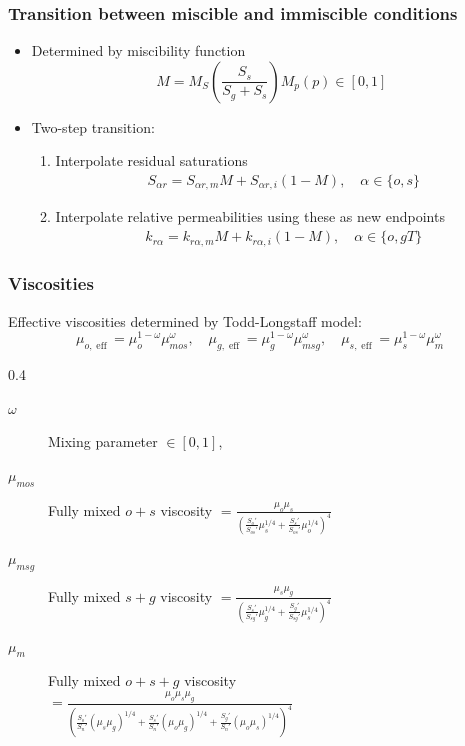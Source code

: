 \documentclass[screen, aspectratio=43]{beamer}
\DeclareMathOperator{\eff}{eff}
\begin{document}
\begin{frame}
  \frametitle{Transition between miscible and immiscible conditions}
  \begin{itemize}
  \item Determined by miscibility function
  \begin{equation*}
      M = M_S\left(\frac{S_s}{S_g + S_s}\right) M_p(p) \in [0,1]
    \end{equation*}
  \item Two-step transition:
    \begin{enumerate}
    \item Interpolate residual saturations
      \begin{align*}
        S_{\alpha r} = S_{\alpha r,m}M + S_{\alpha r,i}(1-M), \quad \alpha \in \{o,s\}
      \end{align*}
    \item Interpolate relative permeabilities using these as new endpoints
      \begin{align*}
        k_{r \alpha} = k_{r\alpha,m}M + k_{r\alpha,i}(1-M), \quad \alpha \in \{o,gT\}
      \end{align*}
    \end{enumerate}
  \end{itemize}
\end{frame}

\begin{frame}
  \frametitle{Viscosities}
  \vspace{0.2cm}
  Effective viscosities determined by Todd-Longstaff model:
  \begin{equation*}
    \mu_{o, \eff} = \mu_o^{1-\omega}\mu_{mos}^\omega, \quad
    \mu_{g, \eff} = \mu_g^{1-\omega}\mu_{msg}^\omega, \quad
    \mu_{s, \eff} = \mu_s^{1-\omega}\mu_{m}^\omega
  \end{equation*}
  \vspace{0.2cm}
  \begin{mybox}{}{0.4\textheight}
    \begin{description}
    \item[$\omega$] Mixing parameter $\in [0,1]$,
    \item[$\mu_{mos}$] Fully mixed $o + s$ viscosity
      $= \frac{\mu_o \mu_s}{\left(\frac{S_o'}{S_{os}'}\mu_s^{1/4} +
          \frac{S_s'}{S_{os}'}\mu_o^{1/4}\right)^4}$
    \item[$\mu_{msg}$] Fully mixed $s + g$ viscosity
      $ = \frac{\mu_s \mu_g}{\left(\frac{S_s'}{S_{sg}'}\mu_g^{1/4} +
          \frac{S_g'}{S_{sg}'}\mu_s^{1/4}\right)^4}$
    \item[$\mu_{m}$] Fully mixed $o +s + g$ viscosity \\
      \hfill $ = \frac{\mu_o \mu_s \mu_g}{\left(\frac{S_o'}{S_{n}'}(\mu_s\mu_g)^{1/4}
          + \frac{S_s'}{S_{n}'}(\mu_o\mu_g)^{1/4}
          + \frac{S_g'}{S_{n}'}(\mu_o\mu_s)^{1/4}\right)^4}$
    \end{description}
  \end{mybox}

\end{frame}
\end{document}
